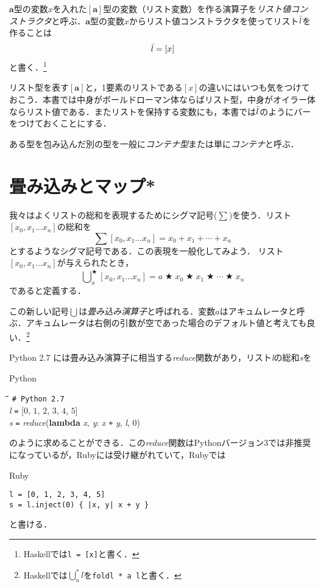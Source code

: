 \documentclass[twocolumn]{jsbook}
\newcommand{\keyword}[1]{{\emph{#1}}}
\newcommand{\code}[1]{\texttt{#1}}
\newenvironment{pythoncode}{\begin{itembox}[r]{Python}}{\end{itembox}}
\newenvironment{rubycode}{\begin{itembox}[r]{Ruby}}{\end{itembox}}
\newenvironment{python}{\begin{tabbing}\hspace*{1em}\=\hspace*{1em}\=\hspace*{1em}\=\hspace*{1em}\=\kill}{\end{tabbing}}
\newcommand{\pthnId}[1]{\textit{#1}}
\newcommand{\pthnKeyword}[1]{\textbf{#1}}
\newcommand{\pthnOp}[1]{\texttt{#1}}
\newcommand{\hsklType}[1]{\textbf{#1}}
\newcommand{\hsklList}[1]{\Bar{#1}}
\newcommand{\hsklListType}[1]{[#1]}
\DeclareMathOperator{\mathAnyBinaryOperator}{\bigstar}
\DeclareMathOperator*{\mathFold}{\bigcup}
\begin{document}
$\hsklType{a}$型の変数$x$を入れた$\hsklListType{\hsklType{a}}$型の変数（リスト変数）を作る演算子を\keyword{リスト値コンストラクタ}と呼ぶ．$\hsklType{a}$型の変数$x$からリスト値コンストラクタを使ってリスト$\hsklList{l}$を作ることは$$\hsklList{l}=[x]$$と書く．\footnote{Haskellでは\code{l = [x]}と書く．}

リスト型を表す$\hsklListType{\hsklType{a}}$と，1要素のリストである$[x]$の違いにはいつも気をつけておこう．本書では中身がボールドローマン体ならばリスト型，中身がオイラー体ならリスト値である．またリストを保持する変数にも，本書では$\hsklList{l}$のようにバーをつけておくことにする．

ある型を包み込んだ別の型を一般に\keyword{コンテナ型}または単に\keyword{コンテナ}と呼ぶ．


\section{畳み込みとマップ*}

我々はよくリストの総和を表現するためにシグマ記号($\sum$)を使う．リスト$[x_0,x_1\dots x_n]$の総和を$$\sum[x_0,x_1\dots x_n]=x_0+x_1+\dotsb+x_n$$とするようなシグマ記号である．この表現を一般化してみよう．
リスト$[x_0,x_1\dots x_n]$が与えられたとき，$$\mathFold^{\mathAnyBinaryOperator}_{a}[x_0,x_1\dots x_n]=a\mathAnyBinaryOperator x_0\mathAnyBinaryOperator x_1\mathAnyBinaryOperator\dotsb\mathAnyBinaryOperator x_n$$であると定義する．

この新しい記号$\mathFold$は\keyword{畳み込み演算子}と呼ばれる．変数$a$はアキュムレータと呼ぶ．アキュムレータは右側の引数が空であった場合のデフォルト値と考えても良い．\footnote{Haskellでは$\mathFold^{*}_{a}l$を\code{foldl * a l}と書く．}

Python 2.7 には畳み込み演算子に相当する\pthnId{reduce}関数があり，リスト\pthnId{l}の総和\pthnId{s}を
\begin{pythoncode}
\begin{python}
\texttt{\# Python 2.7}\\
\pthnId{l} \pthnOp{=} [$0$, $1$, $2$, $3$, $4$, $5$]\\
\pthnId{s} \pthnOp{=} \pthnId{reduce}(\pthnKeyword{lambda} \pthnId{x}, \pthnId{y}: \pthnId{x} \pthnOp{+} \pthnId{y}, \pthnId{l}, $0$)
\end{python}
\end{pythoncode}
のように求めることができる．この\pthnId{reduce}関数はPythonバージョン3では非推奨になっているが，Rubyには受け継がれていて，Rubyでは
\begin{rubycode}
\begin{Verbatim}
l = [0, 1, 2, 3, 4, 5]
s = l.inject(0) { |x, y| x + y }
\end{Verbatim}
\end{rubycode}
と書ける．
\end{document}
